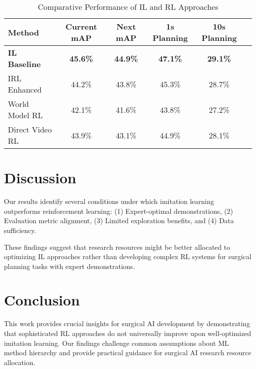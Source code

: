 \documentclass[runningheads]{llncs}
\begin{document}
\begin{table}[h]
\centering
\caption{Comparative Performance of IL and RL Approaches}
\label{tab:main_results}
\begin{tabular}{lccccc}
\toprule
\textbf{Method} & \textbf{Current mAP} & \textbf{Next mAP} & \textbf{1s Planning} & \textbf{10s Planning} \\
\midrule
\textbf{IL Baseline} & \textbf{45.6\%} & \textbf{44.9\%} & \textbf{47.1\%} & \textbf{29.1\%} \\
IRL Enhanced & 44.2\% & 43.8\% & 45.3\% & 28.7\% \\
World Model RL & 42.1\% & 41.6\% & 43.8\% & 27.2\% \\
Direct Video RL & 43.9\% & 43.1\% & 44.9\% & 28.1\% \\
\bottomrule
\end{tabular}
\end{table}

\section{Discussion}

Our results identify several conditions under which imitation learning outperforms reinforcement learning: (1) Expert-optimal demonstrations, (2) Evaluation metric alignment, (3) Limited exploration benefits, and (4) Data sufficiency.

These findings suggest that research resources might be better allocated to optimizing IL approaches rather than developing complex RL systems for surgical planning tasks with expert demonstrations.

\section{Conclusion}

This work provides crucial insights for surgical AI development by demonstrating that sophisticated RL approaches do not universally improve upon well-optimized imitation learning. Our findings challenge common assumptions about ML method hierarchy and provide practical guidance for surgical AI research resource allocation.



\end{document}
